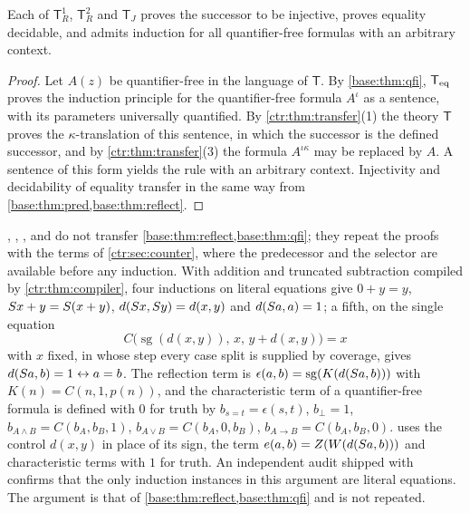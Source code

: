 \begin{proposition}\label{ctr:prop:qfi}
Each of $\mathsf T_R^1$, $\mathsf T_R^2$ and $\mathsf T_J$ proves the successor to be
injective, proves equality decidable, and admits induction for all quantifier-free formulas
with an arbitrary context.
\end{proposition}
\begin{proof}
Let $A(z)$ be quantifier-free in the language of $\mathsf T$. By \cref{base:thm:qfi},
$\mathsf{T}_{\mathrm{eq}}$ proves the induction principle for the quantifier-free formula $A^\iota$ as a
sentence, with its parameters universally quantified. By \cref{ctr:thm:transfer}(1) the
theory $\mathsf T$ proves the $\kappa$-translation of this sentence, in which the successor
is the defined successor, and by \cref{ctr:thm:transfer}(3) the formula $A^{\iota\kappa}$ may
be replaced by $A$. A sentence of this form yields the rule with an arbitrary context.
Injectivity and decidability of equality transfer in the same way from
\cref{base:thm:pred,base:thm:reflect}.
\end{proof}

\begin{remark}\label{ctr:rem:reflection}
, , ,
 and  do not transfer
\cref{base:thm:reflect,base:thm:qfi}; they repeat the proofs with the terms of
\cref{ctr:sec:counter},
where the predecessor and the selector are available before any induction. With addition and
truncated subtraction compiled by \cref{ctr:thm:compiler}, four inductions on literal
equations give $0+y=y$, $S x+y=S(x+y)$, $d(S x,S y)=d(x,y)$ and
$d(S a,a)=1$; a fifth, on the single equation
\[
 C\bigl(\operatorname{sg}(d(x,y)),\,x,\,y+d(x,y)\bigr)=x
\]
with $x$ fixed, in whose step every case split is supplied by coverage, gives
$d(S a,b)=1\leftrightarrow a=b$. The reflection term is
$\epsilon(a,b)=\operatorname{sg}(K(d(S a,b)))$ with $K(n)=C(n,1,p(n))$, and the
characteristic term of a quantifier-free formula is defined with $0$ for truth by
$b_{s=t}=\epsilon(s,t)$, $b_\bot=1$, $b_{A\land B}=C(b_A,b_B,1)$, $b_{A\lor B}=C(b_A,0,b_B)$,
$b_{A\to B}=C(b_A,b_B,0)$.  uses the control $d(x,y)$ in place of its
sign, the term $e(a,b)=Z(W(d(S a,b)))$ and characteristic terms with $1$ for truth. An
independent audit shipped with  confirms that the only induction
instances in this argument are literal equations. The argument is that of
\cref{base:thm:reflect,base:thm:qfi} and is not repeated.
\end{remark}

